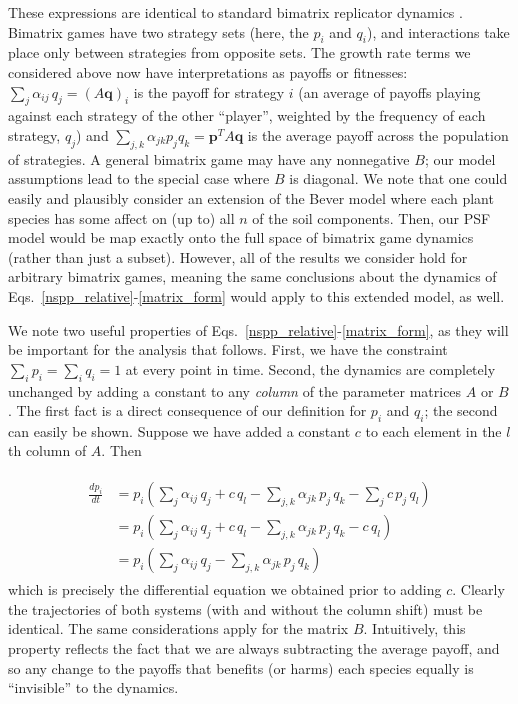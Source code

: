 \documentclass[11pt]{article}
\begin{document}
These expressions are identical to standard bimatrix replicator dynamics \cite{hofbauer1996evolutionary,hofbauer1998evolutionary}. Bimatrix games have two strategy sets (here, the $p_i$ and $q_i$), and interactions take place only between strategies from opposite sets. The growth rate terms we considered above now have interpretations as payoffs or fitnesses: $\sum_{j} \alpha_{ij} \, q_j = (A \bm{q})_i$ is the payoff for strategy $i$ (an average of payoffs playing against each strategy of the other ``player'', weighted by the frequency of each strategy, $q_j$) and $\sum_{j, k} \alpha_{jk} p_j  q_k = \bm{p}^T A \bm{q}$ is the average payoff across the population of strategies. A general bimatrix game may have any nonnegative $B$; our model assumptions lead to the special case where $B$ is diagonal. We note that one could easily and plausibly consider an extension of the Bever model where each plant species has some affect on (up to) all $n$ of the soil components. Then, our PSF model would be map exactly onto the full space of bimatrix game dynamics (rather than just a subset). However, all of the results we consider hold for arbitrary bimatrix games, meaning the same conclusions about the dynamics of Eqs.~\ref{nspp_relative}-\ref{matrix_form} would apply to this extended model, as well. 

We note two useful properties of Eqs.~\ref{nspp_relative}-\ref{matrix_form}, as they will be important for the analysis that follows. First, we have the constraint $\sum_i p_i = \sum_i q_i = 1$ at every point in time. Second, the dynamics are completely unchanged by adding a constant to any \emph{column} of the parameter matrices $A$ or $B$. The first fact is a direct consequence of our definition for $p_i$ and $q_i$; the second can easily be shown. Suppose we have added a constant $c$ to each element in the $l$th column of $A$. Then

\begin{align}
\begin{split}
\frac{dp_i}{dt} &= p_i \left(\sum_{j} \alpha_{ij} \, q_j + c \, q_l - \sum_{j, k} \alpha_{jk} \, p_j \, q_k - \sum_{j} c \, p_j \, q_l \right)\\
&= p_i \left(\sum_{j} \alpha_{ij} \, q_j + c \, q_l - \sum_{j, k} \alpha_{jk} \, p_j \, q_k - c \, q_l \right) \\
&= p_i \left(\sum_{j} \alpha_{ij} \, q_j - \sum_{j, k} \alpha_{jk} \, p_j \, q_k \right)
\end{split}
\end{align}
which is precisely the differential equation we obtained prior to adding $c$. Clearly the trajectories of both systems (with and without the column shift) must be identical. The same considerations apply for the matrix $B$. Intuitively, this property reflects the fact that we are always subtracting the average payoff, and so any change to the payoffs that benefits (or harms) each species equally is ``invisible'' to the dynamics.
\end{document}
